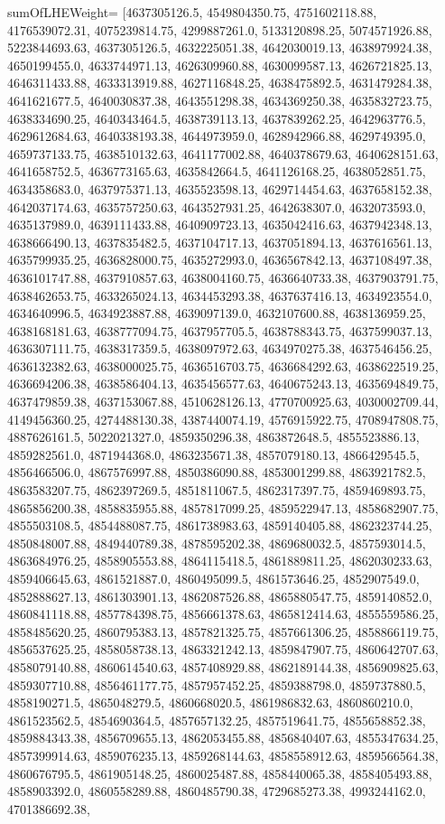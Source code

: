 sumOfLHEWeight=
[4637305126.5, 4549804350.75, 4751602118.88, 4176539072.31, 4075239814.75, 4299887261.0, 5133120898.25, 5074571926.88, 5223844693.63, 4637305126.5, 4632225051.38, 4642030019.13, 4638979924.38, 4650199455.0, 4633744971.13, 4626309960.88, 4630099587.13, 4626721825.13, 4646311433.88, 4633313919.88, 4627116848.25, 4638475892.5, 4631479284.38, 4641621677.5, 4640030837.38, 4643551298.38, 4634369250.38, 4635832723.75, 4638334690.25, 4640343464.5, 4638739113.13, 4637839262.25, 4642963776.5, 4629612684.63, 4640338193.38, 4644973959.0, 4628942966.88, 4629749395.0, 4659737133.75, 4638510132.63, 4641177002.88, 4640378679.63, 4640628151.63, 4641658752.5, 4636773165.63, 4635842664.5, 4641126168.25, 4638052851.75, 4634358683.0, 4637975371.13, 4635523598.13, 4629714454.63, 4637658152.38, 4642037174.63, 4635757250.63, 4643527931.25, 4642638307.0, 4632073593.0, 4635137989.0, 4639111433.88, 4640909723.13, 4635042416.63, 4637942348.13, 4638666490.13, 4637835482.5, 4637104717.13, 4637051894.13, 4637616561.13, 4635799935.25, 4636828000.75, 4635272993.0, 4636567842.13, 4637108497.38, 4636101747.88, 4637910857.63, 4638004160.75, 4636640733.38, 4637903791.75, 4638462653.75, 4633265024.13, 4634453293.38, 4637637416.13, 4634923554.0, 4634640996.5, 4634923887.88, 4639097139.0, 4632107600.88, 4638136959.25, 4638168181.63, 4638777094.75, 4637957705.5, 4638788343.75, 4637599037.13, 4636307111.75, 4638317359.5, 4638097972.63, 4634970275.38, 4637546456.25, 4636132382.63, 4638000025.75, 4636516703.75, 4636684292.63, 4638622519.25, 4636694206.38, 4638586404.13, 4635456577.63, 4640675243.13, 4635694849.75, 4637479859.38, 4637153067.88, 4510628126.13, 4770700925.63, 4030002709.44, 4149456360.25, 4274488130.38, 4387440074.19, 4576915922.75, 4708947808.75, 4887626161.5, 5022021327.0, 4859350296.38, 4863872648.5, 4855523886.13, 4859282561.0, 4871944368.0, 4863235671.38, 4857079180.13, 4866429545.5, 4856466506.0, 4867576997.88, 4850386090.88, 4853001299.88, 4863921782.5, 4863583207.75, 4862397269.5, 4851811067.5, 4862317397.75, 4859469893.75, 4865856200.38, 4858835955.88, 4857817099.25, 4859522947.13, 4858682907.75, 4855503108.5, 4854488087.75, 4861738983.63, 4859140405.88, 4862323744.25, 4850848007.88, 4849440789.38, 4878595202.38, 4869680032.5, 4857593014.5, 4863684976.25, 4858905553.88, 4864115418.5, 4861889811.25, 4862030233.63, 4859406645.63, 4861521887.0, 4860495099.5, 4861573646.25, 4852907549.0, 4852888627.13, 4861303901.13, 4862087526.88, 4865880547.75, 4859140852.0, 4860841118.88, 4857784398.75, 4856661378.63, 4865812414.63, 4855559586.25, 4858485620.25, 4860795383.13, 4857821325.75, 4857661306.25, 4858866119.75, 4856537625.25, 4858058738.13, 4863321242.13, 4859847907.75, 4860642707.63, 4858079140.88, 4860614540.63, 4857408929.88, 4862189144.38, 4856909825.63, 4859307710.88, 4856461177.75, 4857957452.25, 4859388798.0, 4859737880.5, 4858190271.5, 4865048279.5, 4860668020.5, 4861986832.63, 4860860210.0, 4861523562.5, 4854690364.5, 4857657132.25, 4857519641.75, 4855658852.38, 4859884343.38, 4856709655.13, 4862053455.88, 4856840407.63, 4855347634.25, 4857399914.63, 4859076235.13, 4859268144.63, 4858558912.63, 4859566564.38, 4860676795.5, 4861905148.25, 4860025487.88, 4858440065.38, 4858405493.88, 4858903392.0, 4860558289.88, 4860485790.38, 4729685273.38, 4993244162.0, 4701386692.38, 